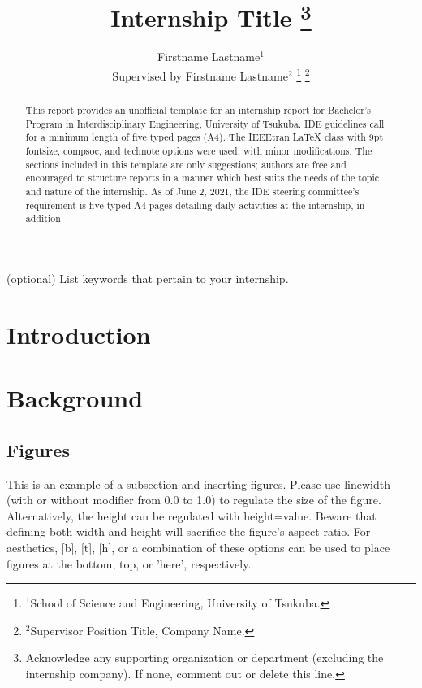 \documentclass[9pt, compsoc, technote, a4paper]{IEEEtran}
\begin{document}
\title{Internship Title
\thanks{Acknowledge any supporting organization or department (excluding the internship company). If none, comment out or delete this line.}
}

\author{\small{Firstname Lastname$^{1}$} \\ \footnotesize{Supervised by Firstname Lastname$^{2}$}
\thanks{$^{1}$School of Science and Engineering, University of Tsukuba.}%
\thanks{$^{2}$Supervisor Position Title, Company Name.}
}

\maketitle

\begin{abstract}
This report provides an unofficial template for an internship report for Bachelor's Program in Interdisciplinary Engineering, University of Tsukuba. IDE guidelines call for a minimum length of five typed pages (A4). The IEEEtran LaTeX class with 9pt fontsize, compsoc, and technote options were used, with minor modifications. The sections included in this template are only suggestions; authors are free and encouraged to structure reports in a manner which best suits the needs of the topic and nature of the internship. As of June 2, 2021, the IDE steering committee's requirement is five typed A4 pages detailing daily activities at the internship, in addition 
\end{abstract}

\begin{IEEEkeywords}
(optional) List keywords that pertain to your internship.
\end{IEEEkeywords}

\section{Introduction}
\lipsum[1]

\section{Background}
\lipsum[1]

\subsection{Figures}
This is an example of a subsection and inserting figures. Please use linewidth (with or without modifier from 0.0 to 1.0) to regulate the size of the figure. Alternatively, the height can be regulated with height={value}. Beware that defining both width and height will sacrifice the figure's aspect ratio. For aesthetics, [b], [t], [h], or a combination of these options can be used to place figures at the bottom, top, or 'here', respectively.
\end{document}
